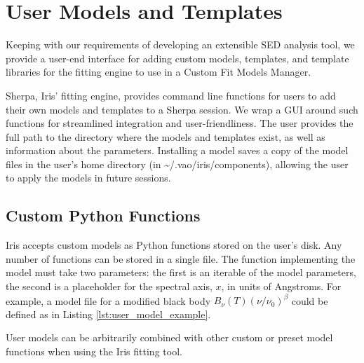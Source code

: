 \documentclass[final,5p,authoryear]{elsarticle}
\begin{document}

\section{User Models and Templates} \label{sec:usermodels}

Keeping with our requirements of developing an extensible SED analysis tool, we
provide a user-end interface for adding custom models, templates, and template
libraries for the fitting engine to use in a Custom Fit Models Manager.

Sherpa, Iris' fitting engine, provides command line functions for users to add
their own models and templates to a Sherpa session. We wrap a GUI around such
functions for streamlined integration and user-friendliness.
The user provides the full path to the directory where the models and templates
exist, as well as information about the parameters. Installing a model saves a
copy of the model files in the user's home directory (in
\~{}/.vao/iris/components), allowing the user to apply the models in future
sessions.


\subsection{Custom Python Functions} Iris accepts custom models as Python
functions stored on the user's disk. Any number of functions can be stored in a
single file. The function implementing the model must take two parameters: the
first is an iterable of the model parameters, the second is a placeholder for
the spectral axis, $x$, in units of Angstroms. For example, a model file for a
modified black body \(B_{\nu}(T) \left(\nu/\nu_{0}\right)^{\beta}\) could be
defined as in Listing \ref{lst:user_model_example}.

User models can be arbitrarily combined with other custom or preset model
functions when using the Iris fitting tool.
\end{document}
